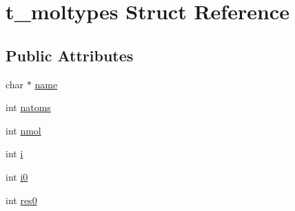 \hypertarget{structt__moltypes}{\section{t\-\_\-moltypes \-Struct \-Reference}
\label{structt__moltypes}
}
\subsection*{\-Public \-Attributes}
\begin{DoxyCompactItemize}
\item 
char $\ast$ \hyperlink{structt__moltypes_a2201563de69f775a56da90c7ddd9c7f5}{name}
\item 
int \hyperlink{structt__moltypes_a8d4de5dc7d2aa442e68f4660df0aaf39}{natoms}
\item 
int \hyperlink{structt__moltypes_ad48c2c1d17b1e7541d7a7c3fe93a9f12}{nmol}
\item 
int \hyperlink{structt__moltypes_ae9f124fb3dda77162bc0eac11e2c735c}{i}
\item 
int \hyperlink{structt__moltypes_a87a6cdb182d1f95ad2fd5cedf96ab0c5}{i0}
\item 
int \hyperlink{structt__moltypes_ac2028c177f761d4b3404edc74ab497d2}{res0}
\end{DoxyCompactItemize}


